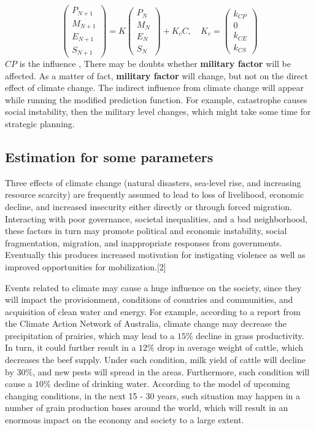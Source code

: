 \documentclass{mcmthesis}
\begin{document}
$$
\left(
\begin{matrix}
P_{N+1} \\ M_{N+1} \\ E_{N+1} \\ S_{N+1}
\end{matrix}
\right) 
= 
K 
\left(
\begin{matrix}
P_N \\ M_N \\ E_N \\ S_N
\end{matrix}
\right) 
+
K_c
C
, \quad
K_c = 
\left(
\begin{matrix}
k_{CP} \\ {0} \\ k_{CE} \\ k_{CS}
\end{matrix}
\right)
$$
$CP$ is the influence , There may be doubts whether \textbf{military factor} will be affected. As a matter of fact, \textbf{military factor} will change, but not on the direct effect of climate change. The indirect influence from climate change will appear while running the modified prediction function. For example, catastrophe causes social instability, then the military level changes, which might take some time for strategic planning.


\subsection{Estimation for some parameters}
Three effects of climate change (natural disasters, sea-level rise, and increasing resource scarcity) are frequently assumed to lead to loss of livelihood, economic decline, and increased insecurity either directly or through forced migration. Interacting with poor governance, societal inequalities, and a bad neighborhood, these factors in turn may promote
political and economic instability, social fragmentation, migration, and inappropriate responses from governments. Eventually this produces increased motivation for instigating violence as well as improved opportunities for mobilization.[2]

Events related to climate may cause a huge influence on the society, since they will impact the provisionment, conditions of countries and communities, and acquisition of clean water and energy. For example, according to a report from the Climate Action Network of Australia, climate change may decrease the precipitation of prairies, which may lead to a $15\%$ decline in grass productivity. In turn, it could further result in a $12\%$ drop in average weight of cattle, which decreases the beef supply. Under such condition, milk yield of cattle will decline by $30\%$, and new pests will spread in the areas. Furthermore, such condition will cause a $10\%$ decline of drinking water. According to the model of upcoming changing conditions, in the next 15 - 30 years, such situation may happen in a number of grain production bases around the world, which will result in an enormous impact on the economy and society to a large extent. 
\end{document}
